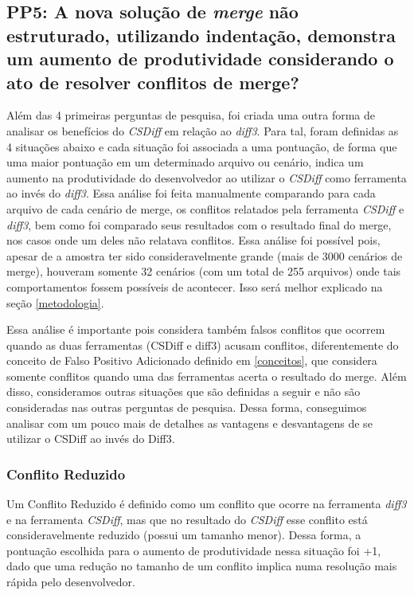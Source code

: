 \subsection{PP5: A nova solução de \emph{merge} não estruturado, utilizando indentação,
	demonstra um aumento de produtividade considerando o ato de resolver conflitos de merge?}\label{concept_PP5}
Além das 4 primeiras perguntas de pesquisa, foi criada uma outra forma de analisar os benefícios do \emph{CSDiff} em relação ao
\emph{diff3}.
Para tal, foram definidas as 4 situações abaixo e cada situação foi associada a uma pontuação, de forma que
uma maior pontuação em um determinado arquivo ou cenário, indica um aumento na produtividade do desenvolvedor ao
utilizar o \emph{CSDiff} como ferramenta ao invés do \emph{diff3}. Essa análise foi feita manualmente comparando para cada
arquivo
de cada cenário de merge, os conflitos relatados pela
ferramenta \emph{CSDiff} e \emph{diff3}, bem como foi comparado seus resultados
com o resultado final do merge, nos casos onde um deles não relatava conflitos. Essa análise foi possível pois, apesar de
a amostra ter sido consideravelmente grande (mais de 3000 cenários de merge), houveram somente 32 cenários (com um total de 255
arquivos) onde tais comportamentos fossem possíveis de acontecer. Isso será melhor explicado na seção \ref{metodologia}.

Essa análise é importante pois considera também falsos conflitos que ocorrem quando as duas ferramentas (CSDiff e diff3)
acusam conflitos, diferentemente do conceito de Falso Positivo Adicionado definido em \ref{conceitos}, que considera somente
conflitos quando uma das ferramentas acerta o resultado do merge.
Além disso, consideramos outras situações que são definidas a seguir e não são consideradas nas outras perguntas de
pesquisa. Dessa forma, conseguimos analisar com um pouco mais de detalhes as
vantagens e desvantagens de se utilizar o CSDiff ao invés
do Diff3.
\subsubsection{Conflito Reduzido}
Um Conflito Reduzido é definido como um conflito que ocorre na ferramenta \emph{diff3} e na ferramenta \emph{CSDiff},
mas que no resultado do \emph{CSDiff} esse conflito está consideravelmente reduzido (possui um tamanho menor). Dessa forma,
a pontuação escolhida para o aumento de produtividade nessa situação foi +1, dado que uma redução no tamanho de um conflito
implica numa resolução mais rápida pelo desenvolvedor.
